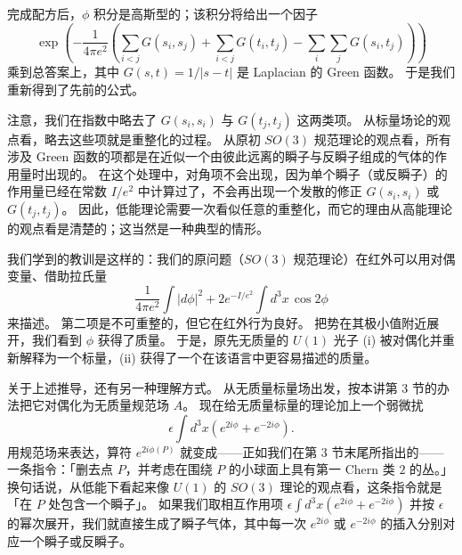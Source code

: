 完成配方后，$\phi$ 积分是高斯型的；该积分将给出一个因子
\begin{equation}
  \tag{8.53}
  \label{eq:8-53}
  \exp\left(-\frac{1}{4\pi e^2}\left(\sum_{i<j}G(s_i,s_j)+\sum_{i<j}G(t_i,t_j)-\sum_i\sum_j G(s_i,t_j)\right)\right)
\end{equation}
乘到总答案上，其中 $G(s,t)=1/|s-t|$ 是 Laplacian 的 Green 函数。
于是我们重新得到了先前的公式。

注意，我们在指数中略去了 $G(s_i,s_i)$ 与 $G(t_j,t_j)$ 这两类项。
从标量场论的观点看，略去这些项就是重整化的过程。
从原初 $SO(3)$ 规范理论的观点看，所有涉及 Green 函数的项都是在近似一个由彼此远离的瞬子与反瞬子组成的气体的作用量时出现的。
在这个处理中，对角项不会出现，因为单个瞬子（或反瞬子）的作用量已经在常数 $I/e^2$ 中计算过了，不会再出现一个发散的修正 $G(s_i,s_i)$ 或 $G(t_j,t_j)$。
因此，低能理论需要一次看似任意的重整化，而它的理由从高能理论的观点看是清楚的；这当然是一种典型的情形。


我们学到的教训是这样的：我们的原问题（$SO(3)$ 规范理论）在红外可以用对偶变量、借助拉氏量
\begin{equation}
  \tag{8.54}
  \label{eq:8-54}
  \frac{1}{4\pi e^2}\int|d\phi|^2+2e^{-I/e^2}\int d^3x\,\cos 2\phi
\end{equation}
来描述。
第二项是不可重整的，但它在红外行为良好。
把势在其极小值附近展开，我们看到 $\phi$ 获得了质量。
于是，原先无质量的 $U(1)$ 光子 (i) 被对偶化并重新解释为一个标量，(ii) 获得了一个在该语言中更容易描述的质量。

关于上述推导，还有另一种理解方式。
从无质量标量场出发，按本讲第 3 节的办法把它对偶化为无质量规范场 $A$。
现在给无质量标量的理论加上一个弱微扰
\[
\epsilon\int d^3x\left(e^{2i\phi}+e^{-2i\phi}\right).
\]
用规范场来表达，算符 $e^{2i\phi(P)}$ 就变成——正如我们在第 3 节末尾所指出的——一条指令：「删去点 $P$，并考虑在围绕 $P$ 的小球面上具有第一 Chern 类 $2$ 的丛。」
换句话说，从低能下看起来像 $U(1)$ 的 $SO(3)$ 理论的观点看，这条指令就是「在 $P$ 处包含一个瞬子」。
如果我们取相互作用项 $\epsilon\int d^3x\left(e^{2i\phi}+e^{-2i\phi}\right)$ 并按 $\epsilon$ 的幂次展开，我们就直接生成了瞬子气体，其中每一次 $e^{2i\phi}$ 或 $e^{-2i\phi}$ 的插入分别对应一个瞬子或反瞬子。

